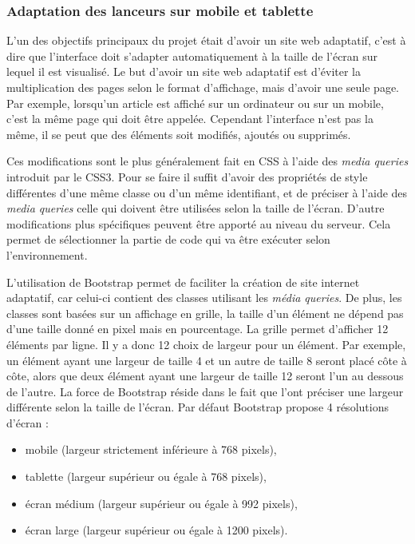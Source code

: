 \documentclass[12pt,a4paper]{article}
\begin{document}
\subsubsection{Adaptation des lanceurs sur mobile et tablette}
L'un des objectifs principaux du projet était d'avoir un site web adaptatif, c'est à dire que l'interface doit s'adapter automatiquement à la taille de l'écran sur lequel il est visualisé. Le but d'avoir un site web adaptatif est d'éviter la multiplication des pages selon le format d'affichage, mais d'avoir une seule page. Par exemple, lorsqu'un article est affiché sur un ordinateur ou sur un mobile, c'est la même page qui doit être appelée. Cependant l'interface n'est pas la même, il se peut que des éléments soit modifiés, ajoutés ou supprimés.\par 
Ces modifications sont le plus généralement fait en CSS à l'aide des \textit{media queries} introduit par le CSS3. Pour se faire il suffit d'avoir des propriétés de style différentes d'une même classe ou d'un même identifiant, et de préciser à l'aide des \textit{media queries} celle qui doivent être utilisées selon la taille de l'écran. D'autre modifications plus spécifiques peuvent être apporté au niveau du serveur. Cela permet de sélectionner la partie de code qui va être exécuter selon l'environnement.\par
L'utilisation de Bootstrap permet de faciliter la création de site internet adaptatif, car celui-ci contient des classes utilisant les \textit{média queries}. De plus, les classes sont basées sur un affichage en grille, la taille d'un élément ne dépend pas d'une taille donné en pixel mais en pourcentage. La grille permet d'afficher 12 éléments par ligne. Il y a donc 12 choix de largeur pour un élément. Par exemple, un élément ayant une largeur de taille 4 et un autre de taille 8 seront placé côte à côte, alors que deux élément ayant une largeur de taille 12 seront l'un au dessous de l'autre. La force de Bootstrap réside dans le fait que l'ont préciser une largeur différente selon la taille de l'écran. Par défaut Bootstrap propose 4 résolutions d'écran :
\begin{itemize}
\item mobile (largeur strictement inférieure à 768 pixels),
\item tablette (largeur supérieur ou égale à 768 pixels),
\item écran médium (largeur supérieur ou égale à 992 pixels),
\item écran large (largeur supérieur ou égale à 1200 pixels).
\end{itemize}
\end{document}
